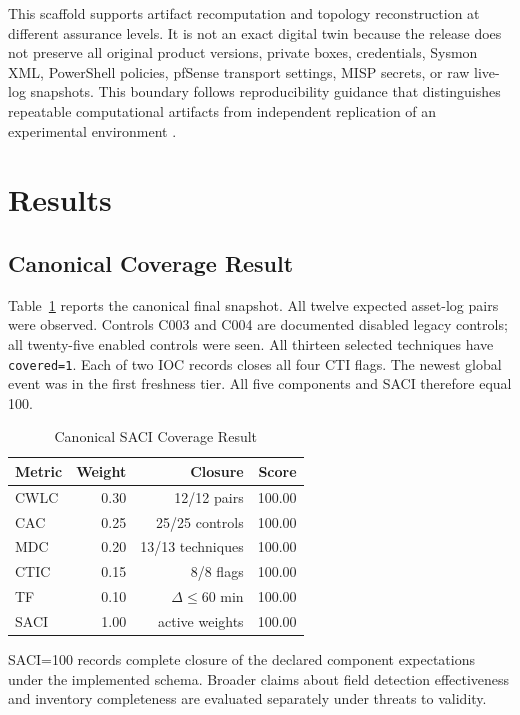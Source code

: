 \documentclass[a4paper,conference]{IEEEtran}
\begin{document}
This scaffold supports artifact recomputation and topology reconstruction at different assurance levels. It is not an exact digital twin because the release does not preserve all original product versions, private boxes, credentials, Sysmon XML, PowerShell policies, pfSense transport settings, MISP secrets, or raw live-log snapshots. This boundary follows reproducibility guidance that distinguishes repeatable computational artifacts from independent replication of an experimental environment \cite{nas_repro,acm_artifacts}.

\section{Results}
\subsection{Canonical Coverage Result}
Table~\ref{tab:finalscores} reports the canonical final snapshot. All twelve expected asset-log pairs were observed. Controls C003 and C004 are documented disabled legacy controls; all twenty-five enabled controls were seen. All thirteen selected techniques have \texttt{covered=1}. Each of two IOC records closes all four CTI flags. The newest global event was in the first freshness tier. All five components and SACI therefore equal 100.

\begin{table}[!t]
\caption{Canonical SACI Coverage Result}
\label{tab:finalscores}
\centering
\small
\begin{tabular}{lrrr}
\toprule
\textbf{Metric} & \textbf{Weight} & \textbf{Closure} & \textbf{Score} \\
\midrule
CWLC & 0.30 & 12/12 pairs & 100.00 \\
CAC & 0.25 & 25/25 controls & 100.00 \\
MDC & 0.20 & 13/13 techniques & 100.00 \\
CTIC & 0.15 & 8/8 flags & 100.00 \\
TF & 0.10 & $\Delta\leq60$ min & 100.00 \\
\midrule
SACI & 1.00 & active weights & 100.00 \\
\bottomrule
\end{tabular}
\end{table}

SACI=100 records complete closure of the declared component expectations under the implemented schema. Broader claims about field detection effectiveness and inventory completeness are evaluated separately under threats to validity.
\end{document}
